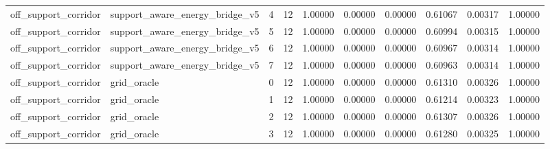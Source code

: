 \documentclass{article}
\begin{document}
\begin{table}[tbp]
{\begin{tabular}{llllllllll}
off\_support\_corridor & support\_aware\_energy\_bridge\_v5 & 4 & 12 & 1.00000 & 0.00000 & 0.00000 & 0.61067 & 0.00317 & 1.00000 \\
off\_support\_corridor & support\_aware\_energy\_bridge\_v5 & 5 & 12 & 1.00000 & 0.00000 & 0.00000 & 0.60994 & 0.00315 & 1.00000 \\
off\_support\_corridor & support\_aware\_energy\_bridge\_v5 & 6 & 12 & 1.00000 & 0.00000 & 0.00000 & 0.60967 & 0.00314 & 1.00000 \\
off\_support\_corridor & support\_aware\_energy\_bridge\_v5 & 7 & 12 & 1.00000 & 0.00000 & 0.00000 & 0.60963 & 0.00314 & 1.00000 \\
off\_support\_corridor & grid\_oracle & 0 & 12 & 1.00000 & 0.00000 & 0.00000 & 0.61310 & 0.00326 & 1.00000 \\
off\_support\_corridor & grid\_oracle & 1 & 12 & 1.00000 & 0.00000 & 0.00000 & 0.61214 & 0.00323 & 1.00000 \\
off\_support\_corridor & grid\_oracle & 2 & 12 & 1.00000 & 0.00000 & 0.00000 & 0.61307 & 0.00326 & 1.00000 \\
off\_support\_corridor & grid\_oracle & 3 & 12 & 1.00000 & 0.00000 & 0.00000 & 0.61280 & 0.00325 & 1.00000 \\
\bottomrule
\end{tabular}
}
\end{table}

\clearpage
\end{document}
